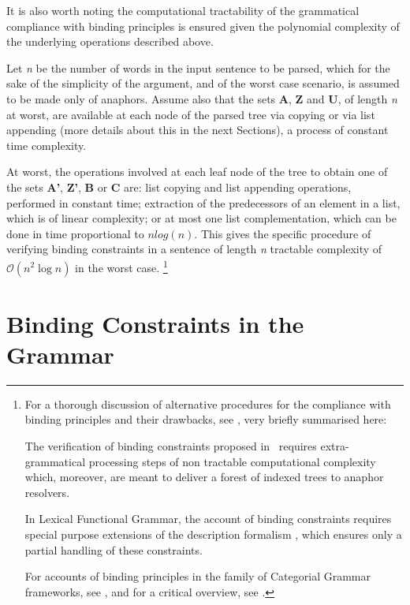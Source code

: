 \documentclass[output=paper
,modfonts
,nonflat]{langsci/langscibook}
\begin{document}
It is also worth noting the computational
tractability of the grammatical compliance with binding principles
is ensured given the polynomial complexity of the underlying operations
described above. 

Let {\it n} be
the number of words in the input sentence to be parsed, which for the
sake of the simplicity of the argument, and of the worst case scenario, 
is assumed to be made only of anaphors. 
Assume also that the sets \textbf{A}, \textbf{Z} and \textbf{U}, of length {\it n} at worst, 
are available at each node of the parsed tree via copying or via list appending 
(more details about this in
the next Sections), a process of constant time complexity. 

At worst, the operations involved at each
leaf node of the tree to obtain one of the sets \textbf{A'}, \textbf{Z'}, \textbf{B} or \textbf{C} are:
list copying and list appending operations, performed in constant time; extraction
of the predecessors of an element in a list, which is of linear complexity;
or at most one list complementation, which can be
done in time proportional to $n log(n)$. This gives
the specific procedure of verifying binding constraints in a sentence
of length {\it n} tractable complexity of $\mathcal{O}(n^2\log{}n)$ in the worst case.%
%
\footnote{
For a thorough discussion of alternative procedures for the compliance
with binding principles and their drawbacks, see \citep{branco:esslli2000}, very briefly summarised here:

The verification of binding constraints proposed in~\citep{chom:bind80,chom:lect81} requires extra-grammatical processing
steps of non tractable computational complexity \citep{correa:bind88, fong:index90} which, moreover, 
are meant to deliver a forest of indexed
trees to anaphor resolvers. 

In Lexical Functional Grammar, the account of binding constraints requires special purpose 
extensions of the description
formalism \citep{dal:bind93}, which ensures only a partial handling
of these constraints.

For accounts of binding principles in  the family of Categorial Grammar frameworks, 
see \citep{szabol:89, hepple:90, morrill:2000}, 
and for a critical overview, see \citep{jaeger:2001}.
}

\section{Binding Constraints in the Grammar\label{spec1}}
\end{document}
